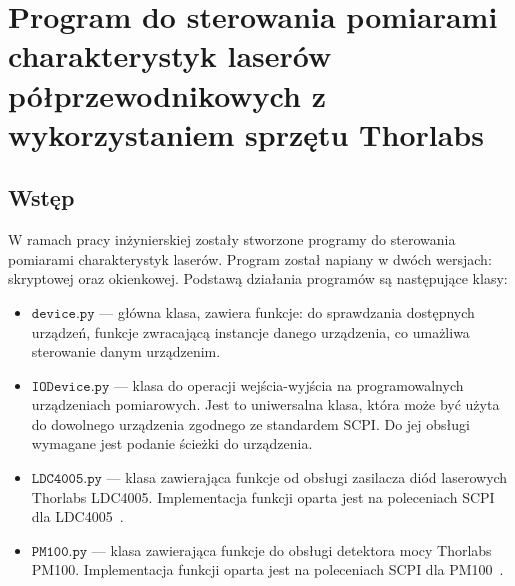 \chapter{Program do sterowania pomiarami charakterystyk laserów półprzewodnikowych z wykorzystaniem sprzętu Thorlabs}
\section{Wstęp}
W ramach pracy inżynierskiej zostały stworzone programy do sterowania pomiarami charakterystyk laserów.
Program został napiany w dwóch wersjach: skryptowej oraz okienkowej. Podstawą działania programów są następujące klasy:
\begin{itemize}
\item $\mathtt{device.py}$ --- główna klasa, zawiera funkcje: do sprawdzania dostępnych urządzeń,
funkcje zwracającą instancje danego urządzenia, co umażliwa sterowanie danym urządzenim.
\item $\mathtt{IODevice.py}$ --- klasa do operacji wejścia-wyjścia na programowalnych urządzeniach pomiarowych. Jest to
uniwersalna klasa, która może być użyta do dowolnego urządzenia zgodnego ze standardem SCPI. Do jej obsługi wymagane jest
podanie ścieżki do urządzenia.
\item $\mathtt{LDC4005.py}$ --- klasa zawierająca funkcje od obsługi zasilacza diód laserowych Thorlabs LDC4005. Implementacja
funkcji oparta jest na poleceniach SCPI dla LDC4005~\cite{Ldc_book_prog}.
\item $\mathtt{PM100.py}$ --- klasa zawierająca funkcje do obsługi detektora mocy Thorlabs PM100. Implementacja
funkcji oparta jest na poleceniach SCPI dla PM100~\cite{Pm100_book}.
\end{itemize}

